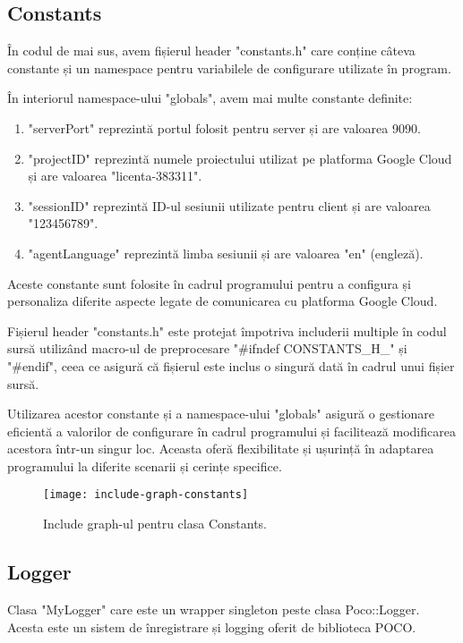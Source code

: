 \subsection{Constants}

În codul de mai sus, avem fișierul header "constants.h" care conține câteva constante și un namespace pentru variabilele de configurare utilizate în program.

În interiorul namespace-ului "globals", avem mai multe constante definite:
\begin{enumerate}
    \item "serverPort" reprezintă portul folosit pentru server și are valoarea 9090.
    \item "projectID" reprezintă numele proiectului utilizat pe platforma Google Cloud și are valoarea "licenta-383311".
    \item "sessionID" reprezintă ID-ul sesiunii utilizate pentru client și are valoarea "123456789".
    \item "agentLanguage" reprezintă limba sesiunii și are valoarea "en" (engleză).
\end{enumerate}

Aceste constante sunt folosite în cadrul programului pentru a configura și personaliza diferite aspecte legate de comunicarea cu platforma Google Cloud.

Fișierul header "constants.h" este protejat împotriva includerii multiple în codul sursă utilizând macro-ul de preprocesare "\#ifndef CONSTANTS\_H\_" și "\#endif", ceea ce asigură că fișierul este inclus o singură dată în cadrul unui fișier sursă.

Utilizarea acestor constante și a namespace-ului "globals" asigură o gestionare eficientă a valorilor de configurare în cadrul programului și facilitează modificarea acestora într-un singur loc. Aceasta oferă flexibilitate și ușurință în adaptarea programului la diferite scenarii și cerințe specifice.

\begin{figure}[h]
  \centering
  \texttt{[image: include-graph-constants]}
  \caption{Include graph-ul pentru clasa Constants.}
  \label{fig:includeGraphConstants}
\end{figure}

\subsection{Logger}

Clasa "MyLogger" care este un wrapper singleton peste clasa Poco::Logger. Acesta este un sistem de înregistrare și logging oferit de biblioteca POCO. 

